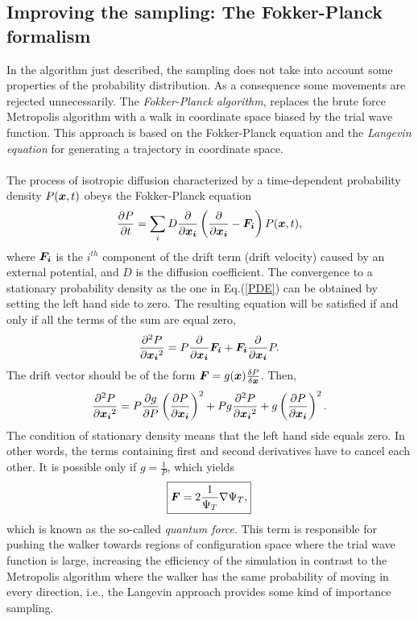 \subsection{Improving the sampling: The Fokker-Planck formalism}
In the algorithm just described, the sampling does not take into account some properties of the probability distribution. As a consequence some movements are rejected unnecessarily. The \emph{Fokker-Planck algorithm}, replaces the brute force Metropolis algorithm with a walk in coordinate space biased by the trial wave function. This approach is based on the Fokker-Planck equation and the \emph{Langevin equation} for generating a trajectory in coordinate space.\\
\\
\noindent
The process of isotropic diffusion characterized by a time-dependent probability density $P(\boldsymbol{x},t)$ obeys the Fokker-Planck equation 
$$
   \frac{\partial P}{\partial t} = \sum_i D\frac{\partial }{\partial \boldsymbol{x_i}}\left(\frac{\partial }{\partial \boldsymbol{x_i}} -\boldsymbol{F_i}\right)P(\boldsymbol{x},t),
$$
where $\boldsymbol{F_i}$ is the $i^{th}$ component of the drift term (drift velocity) caused by an external potential, and $D$ is the diffusion coefficient. The convergence to a stationary probability density as the one in Eq.(\ref{PDE}) can be obtained by setting the left hand side to zero. The resulting equation will be satisfied if and only if all the terms of the sum are equal zero,
$$
\frac{\partial^2 P}{\partial {\boldsymbol{x_i}^2}} = P\frac{\partial}{\partial {\boldsymbol{x_i}}}\boldsymbol{F_i} + \boldsymbol{F_i}\frac{\partial}{\partial {\boldsymbol{x_i}}}P.
$$
The drift vector should be of the form $\boldsymbol{F} = g(\boldsymbol{x}) \frac{\delta P}{\delta \boldsymbol{x}}$. Then,
$$
\frac{\partial^2 P}{\partial {\boldsymbol{x_i}^2}} = P\frac{\partial g}{\partial P}\left( \frac{\partial P}{\partial {\boldsymbol{x_i}}}  \right)^2 + P g \frac{\partial ^2 P}{\partial {\boldsymbol{x_i} ^2}}  + g \left( \frac{\partial P}{\partial {\boldsymbol{x_i}}}  \right)^2.
$$
The condition of stationary density means that the left hand side equals zero. In other words, the terms containing first and second derivatives have to cancel each other. It is possible only if $g = \frac{1}{P}$, which yields
\begin{equation}\label{quantumForceEQ}
\boxed{\boldsymbol{F} = 2\frac{1}{\Psi_T}\nabla\Psi_T,}
\end{equation}
which is known as the so-called \emph{quantum force}. This term is responsible for pushing the walker towards regions of configuration space where the trial wave function is large, increasing the efficiency of the simulation in contrast to the Metropolis algorithm where the walker has the same probability of moving in every direction, i.e., the Langevin approach provides some kind of importance sampling.\\

